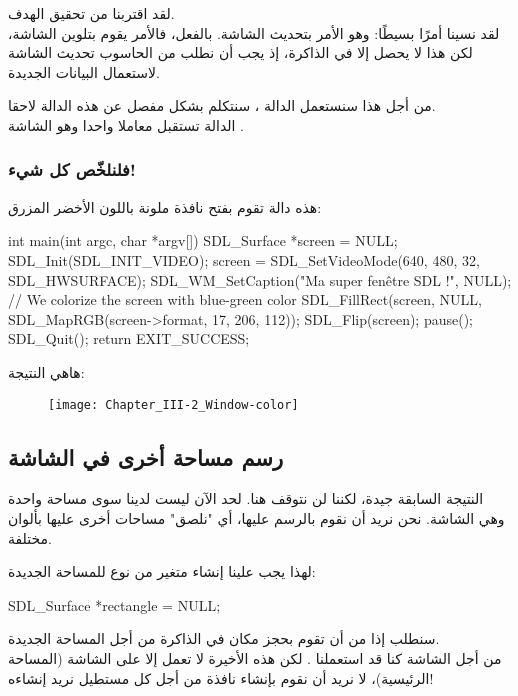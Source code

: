 لقد اقتربنا من تحقيق الهدف.\\
لقد نسينا أمرًا بسيطًا: وهو الأمر بتحديث الشاشة. بالفعل، فالأمر 
يقوم بتلوين الشاشة، لكن هذا لا يحصل إلا في الذاكرة، إذ يجب أن نطلب من الحاسوب تحديث الشاشة لاستعمال البيانات الجديدة.

من أجل هذا سنستعمل الدالة 
،
سنتكلم بشكل مفصل عن هذه الدالة لاحقا.\\
الدالة تستقبل معاملا واحدا وهو الشاشة
.

\subsubsection{فلنلخّص كل شيء!}

هذه دالة
تقوم بفتح نافذة ملونة باللون الأخضر المزرق:

\begin{Csource}
int main(int argc, char *argv[])
{
	SDL_Surface *screen = NULL;
	SDL_Init(SDL_INIT_VIDEO);
	screen = SDL_SetVideoMode(640, 480, 32, SDL_HWSURFACE);
	SDL_WM_SetCaption("Ma super fenêtre SDL !", NULL);
	// We colorize the screen with blue-green color
	SDL_FillRect(screen, NULL, SDL_MapRGB(screen->format, 17, 206, 112));
	SDL_Flip(screen); 
	pause();
	SDL_Quit();
	return EXIT_SUCCESS;
}
\end{Csource}

هاهي النتيجة:

\begin{figure}[H]
	\centering
	\texttt{[image: Chapter\_III-2\_Window-color]}
\end{figure}

\subsection{رسم مساحة أخرى في الشاشة}

النتيجة السابقة جيدة، لكننا لن نتوقف هنا. لحد الآن ليست لدينا سوى مساحة واحدة وهي الشاشة. نحن نريد أن نقوم بالرسم عليها، أي "نلصق" مساحات أخرى عليها بألوان مختلفة.

لهذا يجب علينا إنشاء متغير من نوع
للمساحة الجديدة:

\begin{Csource}
SDL_Surface *rectangle = NULL;
\end{Csource}

سنطلب إذا من 
أن تقوم بحجز مكان في الذاكرة من أجل المساحة الجديدة.\\
من أجل الشاشة كنا قد استعملنا
.
لكن هذه الأخيرة لا تعمل إلا على  الشاشة (المساحة الرئيسية)، لا نريد أن نقوم بإنشاء نافذة من أجل كل مستطيل نريد إنشاءه!

